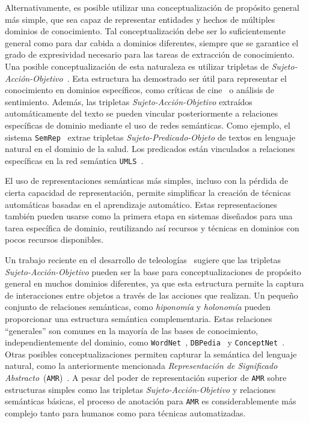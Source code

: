Alternativamente, es posible utilizar una conceptualización de propósito general más simple, que sea capaz de representar entidades y hechos de múltiples dominios de conocimiento.
Tal conceptualización debe ser lo suficientemente general como para dar cabida a dominios diferentes, siempre que se garantice el grado de expresividad necesario para las tareas de extracción de conocimiento.
Una posible conceptualización de esta naturaleza es utilizar tripletas de \textit{Sujeto-Acción-Objetivo}~\cite{suilan2018}.
Esta estructura ha demostrado ser útil para representar el conocimiento en dominios específicos, como críticas de cine~\cite{suilan2018} o análisis de sentimiento.
Además, las tripletas \textit{Sujeto-Acción-Objetivo} extraídos automáticamente del texto se pueden vincular posteriormente a relaciones específicas de dominio mediante el uso de redes semánticas.
Como ejemplo, el sistema \texttt{SemRep}~\cite{semrep} extrae tripletas \textit{Sujeto-Predicado-Objeto} de textos en lenguaje natural en el dominio de la salud.
Los predicados están vinculados a relaciones específicas en la red semántica \texttt{UMLS}~\cite{umls}.

El uso de representaciones semánticas más simples, incluso con la pérdida de cierta capacidad de representación, permite simplificar la creación de técnicas automáticas basadas en el aprendizaje automático.
Estas representaciones también pueden usarse como la primera etapa en sistemas diseñados para una tarea específica de dominio, reutilizando así recursos y técnicas en dominios con pocos recursos disponibles.

Un trabajo reciente en el desarrollo de teleologías~\cite{teleologies} sugiere que las tripletas \textit{Sujeto-Acción-Objetivo} pueden ser la base para conceptualizaciones de propósito general en muchos dominios diferentes, ya que esta estructura permite la captura de interacciones entre objetos a través de las acciones que realizan.
Un pequeño conjunto de relaciones semánticas, como \textit{hiponomía} y \textit{holonomía} pueden proporcionar una estructura semántica complementaria.
Estas relaciones ``generales'' son comunes en la mayoría de las bases de conocimiento, independientemente del dominio, como \texttt{WordNet}~\cite{miller1998wordnet},
\texttt{DBPedia}~\cite{lehmann2015dbpedia} y \texttt{ConceptNet}~\cite{conceptnet}.
Otras posibles conceptualizaciones permiten capturar la semántica del lenguaje natural, como la anteriormente mencionada \textit{Representación de Significado Abstracto}~(\texttt{AMR})~\cite{amr}.
A pesar del poder de representación superior de \texttt{AMR} sobre estructuras simples como las tripletas \textit{Sujeto-Acción-Objetivo} y relaciones semánticas básicas, el proceso de anotación para \texttt{AMR} es considerablemente más complejo tanto para humanos como para técnicas automatizadas.

